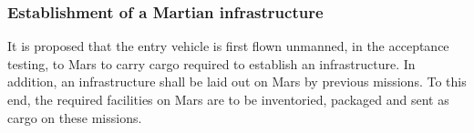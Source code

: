 \subsubsection{Establishment of a Martian infrastructure}
It is proposed that the entry vehicle is first flown unmanned, in the acceptance testing, to Mars to carry cargo required to establish an infrastructure. In addition, an infrastructure shall be laid out on Mars by previous missions. To this end, the required facilities on Mars are to be inventoried, packaged and sent as cargo on these missions.



